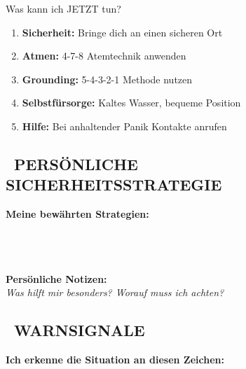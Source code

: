 \begin{ctmmGreenBox}{Was kann ich JETZT tun?}
\begin{enumerate}
  \item \textbf{Sicherheit:} Bringe dich an einen sicheren Ort
  \item \textbf{Atmen:} 4-7-8 Atemtechnik anwenden
  \item \textbf{Grounding:} 5-4-3-2-1 Methode nutzen
  \item \textbf{Selbstfürsorge:} Kaltes Wasser, bequeme Position
  \item \textbf{Hilfe:} Bei anhaltender Panik Kontakte anrufen
\end{enumerate}
\end{ctmmGreenBox}

\subsection*{\textcolor{ctmmRed}{\faShieldAlt~PERSÖNLICHE SICHERHEITSSTRATEGIE}}

\textbf{Meine bewährten Strategien:}\\
 \quad
{} \\
 \quad
{} \\
 \quad
{} \\
 

\vspace{0.5cm}
\textbf{Persönliche Notizen:}\\
\textit{Was hilft mir besonders? Worauf muss ich achten?}\\

\subsection*{\textcolor{ctmmRed}{\faExclamationCircle~WARNSIGNALE}}

\textbf{Ich erkenne die Situation an diesen Zeichen:}\\

